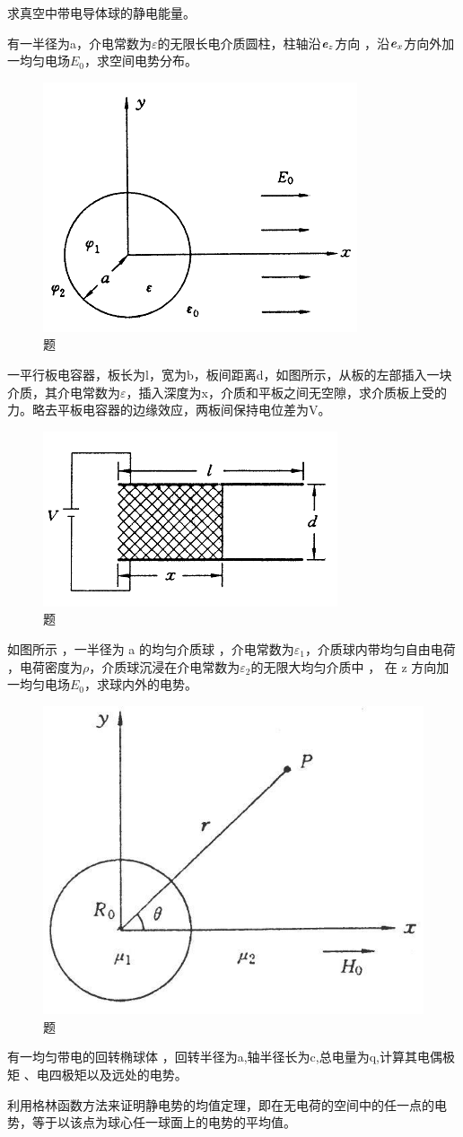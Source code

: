 \begin{question}
求真空中带电导体球的静电能量。
\end{question}

\begin{question}
有一半径为a，介电常数为$\varepsilon$的无限长电介质圆柱，柱轴沿$\textbf{\textit{e}}_z$方向
，沿$\textbf{\textit{e}}_x$方向外加一均匀电场$E_0$，求空间电势分布。
\begin{figure}[ht]
\centering
\includegraphics[height=3 cm]{images/q1_2_7.png}
\caption{题\thequestion}
\end{figure}
\end{question}

\begin{question}
一平行板电容器，板长为l，宽为b，板间距离d，如图所示，从板的左部插入一块介质，其介电常数为$\varepsilon$，插入深度为x，介质和平板之间无空隙，求介质板上受的力。略去平板电容器的边缘效应，两板间保持电位差为V。
\begin{figure}[ht]
\centering
\includegraphics[height=3 cm]{images/q1_2_8.png}
\caption{题\thequestion}
\end{figure}
\end{question}

\begin{question}
如图所示 ，一半径为 a 的均匀介质球 ，介电常数为$\varepsilon_1$，介质球内带均匀自由电荷 ，电荷密度为$\rho$，介质球沉浸在介电常数为$\varepsilon_2$的无限大均匀介质中 ， 在 z 方向加一均匀电场$E_0$，求球内外的电势。
\begin{figure}[ht]
\centering
\includegraphics[height=3 cm]{images/q1_2_9.jpg}
\caption{题\thequestion}
\end{figure}
\end{question}

\begin{question}
有一均匀带电的回转椭球体 ，回转半径为a,轴半径长为c,总电量为q,计算其电偶极矩 、电四极矩以及远处的电势。
\end{question}

\begin{question}
利用格林函数方法来证明静电势的均值定理，即在无电荷的空间中的任一点的电势，等于以该点为球心任一球面上的电势的平均值。
\end{question}